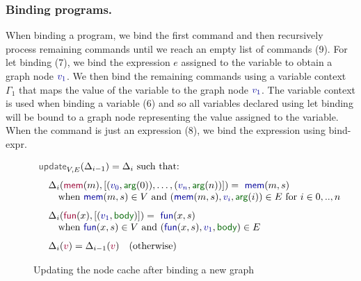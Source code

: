 \documentclass[acmsmall,anonymous,fleqn]{acmart}\settopmatter{printfolios=false,printccs=false,printacmref=false}
\theoremstyle{plain}
\theoremstyle{definition}
\newcommand{\ident}[1]{\textnormal{\textcolor{idclr}{\sffamily #1}}}
\newcommand{\kvd}[1]{\textnormal{\textcolor{kvdclr}{\sffamily #1}}}
\newcommand{\bndclr}[1]{\textcolor{kvdclr}{#1}}
\newcommand{\bkndclr}[1]{\textcolor{prepclr}{#1}}
\newcommand{\bnd}[1]{\textnormal{\textcolor{kvdclr}{\sffamily #1}}}
\newcommand{\bknd}[1]{\textnormal{\textcolor{prepclr}{\sffamily #1}}}
\newcommand{\blbl}[1]{\textnormal{\textcolor{numclr}{\sffamily #1}}}
\begin{document}
\subsubsection{Binding programs.} When binding a program, we bind the first command and then
recursively process remaining commands until we reach an empty list of commands (9).
For \kvd{let} binding (7), we bind the expression $e$ assigned to the variable to obtain a
graph node $\bndclr{v_1}$. We then bind the remaining commands using a variable context $\Gamma_1$
that maps the value of the variable to the graph node $\bndclr{v_1}$. The variable context is used
when binding a variable (6) and so all variables declared using \kvd{let} binding will be bound to
a graph node representing the value assigned to the variable. When the command is just an
expression (8), we bind the expression using \ident{bind-expr}.


\begin{figure}
\begin{equation*}
\begin{array}{l}
\ident{update}_{V,E}(\Delta_{i-1}) = \Delta_i~\textnormal{such that:}
\\[0.75em]
\quad\Delta_{i}(\bknd{mem}(m), [(\bndclr{v_0},\blbl{arg}(0)),\ldots, (\bndclr{v_n},\blbl{arg}(n))]) = \bnd{mem}(m, s)\\
\quad\quad \textnormal{when}~\bnd{mem}(m, s) \in V
~\textnormal{and}~(\bnd{mem}(m, s), \bndclr{v_i}, \blbl{arg}(i)) \in E~\textnormal{for}~i\in 0,..,n
\\[0.75em]
\quad\Delta_{i}(\bknd{fun}(x), [(\bndclr{v_1},\blbl{body})]) = \bnd{fun}(x, s)\\
\quad\quad \textnormal{when}~\bnd{fun}(x, s) \in V
~\textnormal{and}~(\bnd{fun}(x, s), \bndclr{v_1}, \blbl{body}) \in E
\\[0.75em]
\quad\Delta_{i}(\bkndclr{v}) = \Delta_{i-1}(\bkndclr{v})\quad \textnormal{(otherwise)}
\end{array}
\end{equation*}
\vspace{-1em}
\caption{Updating the node cache after binding a new graph}
\label{fig:loop}
\vspace{-0.5em}
\end{figure}

\end{document}
